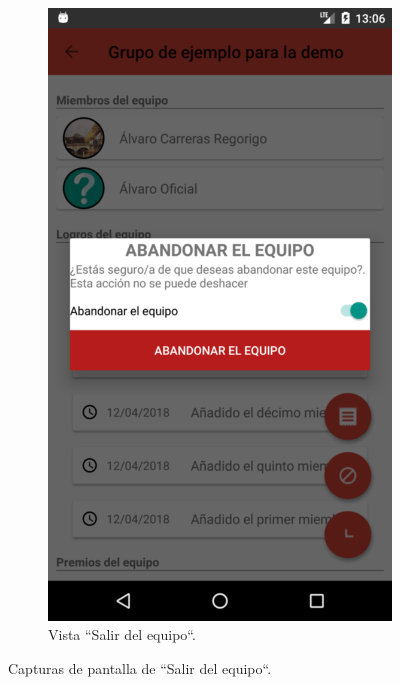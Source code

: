\documentclass[twoside]{report}
\begin{document}
\begin{figure}[H]
\begin{center}
	\begin{subfigure}[t]{.3\linewidth}
		\includegraphics[scale=0.2]{images/userguide/22.png}
		\caption{Vista “Salir del equipo“.}
	\end{subfigure}\hspace{5mm}%
\caption{Capturas de pantalla de “Salir del equipo“.}
\end{center}
\end{figure}

\end{document}

